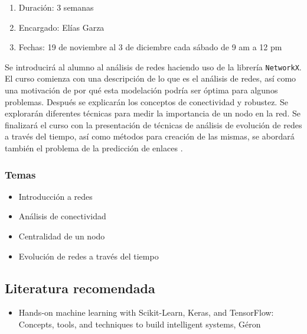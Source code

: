 \documentclass{article}
\begin{document}
            \begin{enumerate}
                \item Duración: 3 semanas
                \item Encargado: Elías Garza
                \item Fechas: 19 de noviembre al 3 de diciembre cada sábado de 9 am a 12 pm
            \end{enumerate}

            Se introducirá al alumno al análisis de redes haciendo uso de la librería \texttt{NetworkX}. El curso comienza con una descripción de lo que es el análisis de redes, así como una motivación de por qué esta modelación podría ser óptima para algunos problemas. Después se explicarán los conceptos de conectividad y robustez. Se explorarán diferentes técnicas para medir la importancia de un nodo en la red. Se finalizará el curso con la presentación de técnicas de análisis de evolución de redes a través del tiempo, así como métodos para creación de las mismas, se abordará también el problema de la predicción de enlaces \cite{network-analysis}.

            \subsubsection{Temas}

                \begin{itemize}
                    \item Introducción a redes
                    \item Análisis de conectividad
                    \item Centralidad de un nodo
                    \item Evolución de redes a través del tiempo
                \end{itemize}
        
        \subsection{Literatura recomendada}

            \begin{itemize}
                \item Hands-on machine learning with Scikit-Learn, Keras, and TensorFlow: Concepts, tools, and techniques to build intelligent systems, Géron \cite{geron2019hands}
            \end{itemize}
\end{document}
